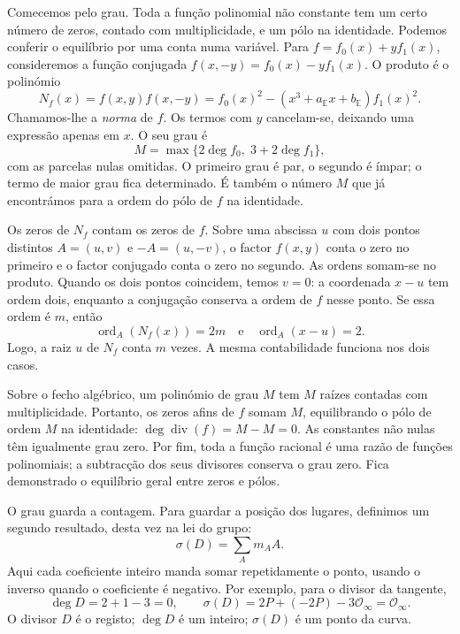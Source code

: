 Comecemos pelo grau. Toda a função polinomial não constante tem um
certo número de zeros, contado com multiplicidade, e um pólo na
identidade. Podemos conferir o equilíbrio por uma conta numa variável.
Para \(f=f_0(x)+yf_1(x)\), consideremos a função conjugada
\(f(x,-y)=f_0(x)-yf_1(x)\). O produto é o polinómio
\[
 N_f(x)=f(x,y)f(x,-y)
       =f_0(x)^2-(x^3+a_{\mathbb E}x+b_{\mathbb E})f_1(x)^2.
\]
Chamamos-lhe a \emph{norma} de \(f\). Os termos com \(y\)
cancelam-se, deixando uma expressão apenas em \(x\). O seu grau é
\[
 M=\max\{2\deg f_0,\;3+2\deg f_1\},
\]
com as parcelas nulas omitidas. O primeiro grau é par, o segundo é
ímpar; o termo de maior grau fica determinado. É também o número
\(M\) que já encontrámos para a ordem do pólo de \(f\) na identidade.

Os zeros de \(N_f\) contam os zeros de \(f\). Sobre uma abscissa
\(u\) com dois pontos distintos \(A=(u,v)\) e \(-A=(u,-v)\),
o factor \(f(x,y)\) conta o zero no primeiro e o factor conjugado
conta o zero no segundo. As ordens somam-se no produto. Quando os
dois pontos coincidem, temos \(v=0\): a coordenada \(x-u\) tem
ordem dois, enquanto a conjugação conserva a ordem de \(f\) nesse
ponto. Se essa ordem é \(m\), então
\[
 \operatorname{ord}_A(N_f(x))=2m
 \quad\text{e}\quad
 \operatorname{ord}_A(x-u)=2.
\]
Logo, a raiz \(u\) de \(N_f\) conta \(m\) vezes. A mesma
contabilidade funciona nos dois casos.

Sobre o fecho algébrico, um polinómio de grau \(M\) tem \(M\)
raízes contadas com multiplicidade. Portanto, os zeros afins de \(f\)
somam \(M\), equilibrando o pólo de ordem \(M\) na identidade:
\(\deg\operatorname{div}(f)=M-M=0\). As constantes não nulas
têm igualmente grau zero. Por fim, toda a função racional é uma razão
de funções polinomiais; a subtracção dos seus divisores conserva o grau
zero. Fica demonstrado o equilíbrio geral entre zeros e pólos.

O grau guarda a contagem. Para guardar a posição dos lugares, definimos
um segundo resultado, desta vez na lei do grupo:
\[
 \sigma(D)=\sum_A m_A A.
\]
Aqui cada coeficiente inteiro manda somar repetidamente o ponto, usando
o inverso quando o coeficiente é negativo. Por exemplo, para o divisor
da tangente,
\[
 \deg D=2+1-3=0,
 \qquad \sigma(D)=2P+(-2P)-3\mathcal O_\infty=\mathcal O_\infty.
\]
O divisor \(D\) é o registo; \(\deg D\) é um inteiro;
\(\sigma(D)\) é um ponto da curva.

